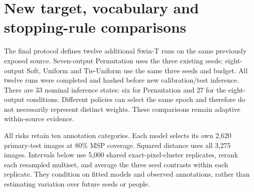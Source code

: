 \clearpage\section{New target, vocabulary and stopping-rule comparisons}
\label{supp:new-followup}
The final protocol defines twelve additional Swin-T runs on the same previously exposed source. Seven-output Permutation uses the three existing seeds; eight-output Soft, Uniform and Tie-Uniform use the same three seeds and budget. All twelve runs were completed and hashed before new calibration/test inference. There are 33 nominal inference states: six for Permutation and 27 for the eight-output conditions. Different policies can select the same epoch and therefore do not necessarily represent distinct weights. These comparisons remain adaptive within-source evidence.

All risks retain ten annotation categories. Each model selects its own 2,620 primary-test images at 80\% MSP coverage. Squared distance uses all 3,275 images. Intervals below use 5,000 shared exact-pixel-cluster replicates, rerank each resampled multiset, and average the three seed contrasts within each replicate. They condition on fitted models and observed annotations, rather than estimating variation over future seeds or people.

